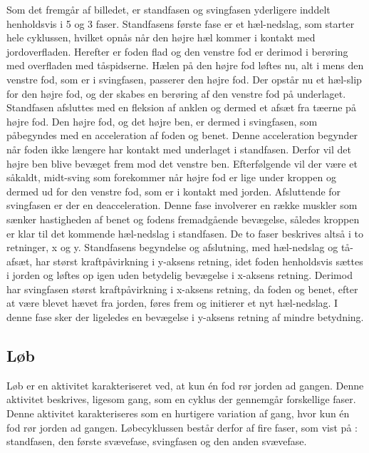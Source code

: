 Som det fremgår af billedet, er standfasen og svingfasen yderligere inddelt henholdsvis i 5 og 3 faser. \newline
Standfasens første fase er et hæl-nedslag, som starter hele cyklussen, hvilket opnås når den højre hæl kommer i kontakt med jordoverfladen. Herefter er foden flad og den venstre fod er derimod i berøring med overfladen med tåspidserne. Hælen på den højre fod løftes nu, alt i mens den venstre fod, som er i svingfasen, passerer den højre fod. Der opstår nu et hæl-slip for den højre fod, og der skabes en berøring af den venstre fod på underlaget. Standfasen afsluttes med en fleksion af anklen og dermed et afsæt fra tæerne på højre fod.  \citep{VaughanDavisOConnor1992,Whittle1990}  \newline
Den højre fod, og det højre ben, er dermed i svingfasen, som påbegyndes med en acceleration af foden og benet. Denne acceleration begynder når foden ikke længere har kontakt med underlaget i standfasen. Derfor vil det højre ben blive bevæget frem mod det venstre ben. Efterfølgende vil der være et såkaldt, midt-sving som forekommer når højre fod er lige under kroppen og dermed ud for den venstre fod, som er i kontakt med jorden. Afsluttende for svingfasen er der en deacceleration. Denne fase involverer en række muskler som sænker hastigheden af benet og fodens fremadgående bevægelse, således kroppen er klar til det kommende hæl-nedslag i standfasen. \citep{VaughanDavisOConnor1992,Whittle1990} \newline
De to faser beskrives altså i to retninger, x og y. Standfasens begyndelse og afslutning, med hæl-nedslag og tå-afsæt, har størst kraftpåvirkning i y-aksens retning, idet foden henholdsvis sættes i jorden og løftes op igen uden betydelig bevægelse i x-aksens retning. Derimod har svingfasen størst kraftpåvirkning i x-aksens retning, da foden og benet, efter at være blevet hævet fra jorden, føres frem og initierer et nyt hæl-nedslag. I denne fase sker der ligeledes en bevægelse i y-aksens retning af mindre betydning. \citep{Rueterbories2010} 

\subsection{Løb}
Løb er en aktivitet karakteriseret ved, at kun én fod rør jorden ad gangen. Denne aktivitet beskrives, ligesom gang, som en cyklus der gennemgår forskellige faser. Denne aktivitet karakteriseres som en hurtigere variation af gang, hvor kun én fod rør jorden ad gangen. Løbecyklussen består derfor af fire faser, som vist på : standfasen, den første svævefase, svingfasen og den anden svævefase. \citep{Adelaar1986,Novacheck1998}

